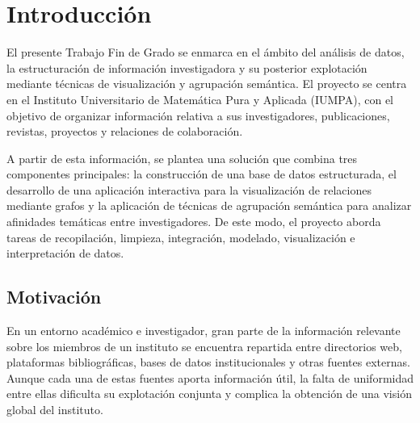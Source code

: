 \documentclass[11pt,spanish,listoffigures,listoftables]{tfgetsinf}
\begin{document}
\cleardoublepage


\mainmatter



\chapter{Introducción} 

El presente Trabajo Fin de Grado se enmarca en el ámbito del análisis de datos, la estructuración de información investigadora y su posterior explotación mediante técnicas de visualización y agrupación semántica. El proyecto se centra en el Instituto Universitario de Matemática Pura y Aplicada (IUMPA), con el objetivo de organizar información relativa a sus investigadores, publicaciones, revistas, proyectos y relaciones de colaboración.

A partir de esta información, se plantea una solución que combina tres componentes principales: la construcción de una base de datos estructurada, el desarrollo de una aplicación interactiva para la visualización de relaciones mediante grafos y la aplicación de técnicas de agrupación semántica para analizar afinidades temáticas entre investigadores. De este modo, el proyecto aborda tareas de recopilación, limpieza, integración, modelado, visualización e interpretación de datos.

\section{Motivación}

En un entorno académico e investigador, gran parte de la información relevante sobre los miembros de un instituto se encuentra repartida entre directorios web, plataformas bibliográficas, bases de datos institucionales y otras fuentes externas. Aunque cada una de estas fuentes aporta información útil, la falta de uniformidad entre ellas dificulta su explotación conjunta y complica la obtención de una visión global del instituto.
\end{document}
